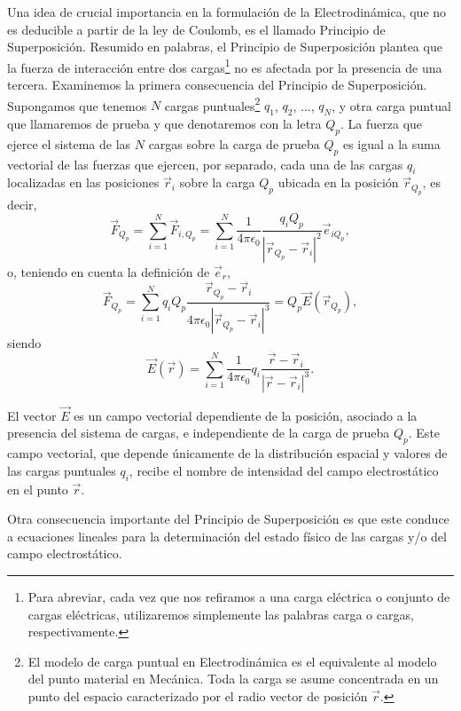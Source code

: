 \documentclass[12pt,a4paper]{book}
\begin{document}
Una idea de crucial importancia en la formulación de la Electrodinámica, que no es deducible a partir de la ley de Coulomb, es el llamado Principio de Superposición. Resumido en palabras, el Principio de Superposición plantea que la fuerza de interacción entre dos cargas\footnote{Para abreviar, cada vez que nos refiramos a una carga eléctrica o conjunto de cargas eléctricas, utilizaremos simplemente las palabras carga o cargas, respectivamente.} no es afectada por la presencia de una tercera. Examinemos la primera consecuencia del Principio de Superposición. Supongamos que tenemos $N$ cargas puntuales\footnote{El modelo de carga puntual en Electrodinámica es el equivalente al modelo del punto material en Mecánica. Toda la carga se asume concentrada en un punto del espacio caracterizado por el radio vector de posición $\vec{r}$.} $q_1$, $q_2$, ..., $q_N$, y otra carga puntual que llamaremos de prueba y que denotaremos con la letra $Q_p$. La fuerza que ejerce el sistema de las $N$ cargas sobre la carga de prueba $Q_p$ es igual a la suma vectorial de las fuerzas que ejercen, por separado, cada una de las cargas $q_i$ localizadas en las posiciones $\vec{r}_i$ sobre la carga $Q_p$ ubicada en la posición $\vec{r}_{Q_p}$, es decir,
\begin{equation}
\vec{F}_{Q_p} = \sum_{i=1}^{N} \vec{F}_{i,Q_p} = \sum_{i=1}^{N} \frac{1}{4\pi\epsilon_0}\frac{q_i Q_p}{|\vec{r}_{Q_p} - \vec{r}_i|^2}\vec{e}_{iQ_p},
\end{equation}
o, teniendo en cuenta la definición de $\vec{e}_r$,
\begin{equation}
\vec{F}_{Q_p} = \sum_{i=1}^{N} q_i Q_p \frac{\vec{r}_{Q_p} - \vec{r}_i}{4\pi\epsilon_0 |\vec{r}_{Q_p} - \vec{r}_i|^3} = Q_p \vec{E}(\vec{r}_{Q_p}),
\end{equation}
siendo 
\begin{equation}
\vec{E}(\vec{r}) = \sum_{i=1}^{N} \frac{1}{4\pi\epsilon_0} q_i \frac{\vec{r} - \vec{r}_i}{|\vec{r} - \vec{r}_i|^3}.
\end{equation}

El vector $\vec{E}$ es un campo vectorial dependiente de la posición, asociado a la presencia del sistema de cargas, e independiente de la carga de prueba $Q_p$. Este campo vectorial, que depende únicamente de la distribución espacial y valores de las cargas puntuales $q_i$, recibe el nombre de intensidad del campo electrostático en el punto $\vec{r}$.

Otra consecuencia importante del Principio de Superposición es que este conduce a ecuaciones lineales para la determinación del estado físico de las cargas y/o del campo electrostático.
\end{document}
